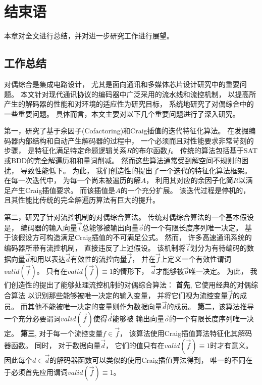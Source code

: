 \chapter{结束语}
\label{chap:8}
本章对全文进行总结，并对进一步研究工作进行展望。

\section{工作总结}
对偶综合是集成电路设计，
尤其是面向通讯和多媒体芯片设计研究中的重要问题。
本文针对现代通讯协议的编码器中广泛采用的流水线和流控机制，
以提高所产生的解码器的性能和对环境的适应性为研究目标，
系统地研究了对偶综合中的一些重要问题。
具体而言，本文主要对以下几个重要问题进行了深入研究。

第一，研究了基于余因子(Cofactoring)和Craig插值的迭代特征化算法。
在发掘编码器内部结构和自动产生解码器的过程中，
一个必须而且对性能要求非常苛刻的步骤，
是特征化满足特定命题逻辑关系$R$的布尔函数$f$。
传统的算法包括基于SAT或BDD的完全解遍历和和量词削减。
然而这些算法通常受到解空间不规则的困扰，
导致性能低下。
为此，
我们创造性的提出了一个迭代的特征化算法框架。
在每一次迭代中，
为每一个尚未被遍历的解$A$，
利用其对应的余因子化简$R$以满足产生Craig插值要求。
而该插值是$A$的一个充分扩展。
该迭代过程是停机的，
且其性能比传统的完全解遍历算法有巨大的提升。

第二，研究了针对流控机制的对偶综合算法。
传统对偶综合算法的一个基本假设是，
编码器的输入向量$\vec{i}$总能够被输出向量$\vec{o}$的一个有限长度序列唯一决定。
基于该假设方可构造满足Craig插值的不可满足公式。
然而，
许多高速通讯系统的编码器所带有流控机制，
直接违反了上述假设。
该机制将$\vec{i}$划分为有待编码的数据向量$\vec{d}$和用以表达$\vec{d}$有效性的流控向量$\vec{f}$，
并在$\vec{f}$上定义一个有效性谓词$valid(\vec{f})$。
只有在$valid(\vec{f})\equiv 1$的情形下，
$\vec{d}$才能够被$\vec{o}$唯一决定。
为此，
我们创造性的提出了能够处理流控机制的对偶综合算法：
\textbf{首先},
它使用经典的对偶综合算法
以识别那些能够被唯一决定的输入变量，
并将它们视为流控变量$\vec{f}$的成员。
而其他不能被唯一决定的变量则作为数据向量$\vec{d}$的成员。
\textbf{第二}，该算法推导一个充分必要谓词$valid(\vec{f})$使得$\vec{d}$能够被
输出向量$\vec{o}$的一个有限长度序列唯一决定。
\textbf{第三},
对于每一个流控变量$f\in\vec{f}$，
该算法使用Craig插值算法特征化其解码器函数。
同时，
对于数据向量$\vec{d}$，
它们的值只有在$valid(\vec{f}) \equiv 1$时才有意义。
因此每个$d\in\vec{d}$的解码器函数可以类似的使用Craig插值算法得到，
唯一的不同在于必须首先应用谓词$valid(\vec{f}) \equiv 1$。



